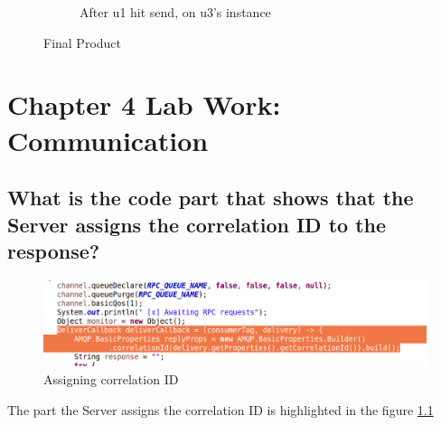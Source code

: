 \documentclass[11pt,a4paper]{report}
\begin{document}
\begin{figure}[h!]
\begin{subfigure}[b]{0.4\linewidth}
    		\caption{After u1 hit send, on u3's instance}
  		\end{subfigure}
  		\caption{Final Product}
  		\label{fig:chat}
	\end{figure}
	
	\chapter{Chapter 4 Lab Work: Communication}
	\newpage
	\section{What is the code part that shows that the Server assigns the correlation ID to the response?}
  	\begin{figure}[h!]
  		\includegraphics[width=\linewidth]{assign-corr-id.png}
  		\caption{Assigning correlation ID}
  		\label{fig:corr-id}
	\end{figure}
  	The part the Server assigns the correlation ID is highlighted in the figure \ref{fig:corr-id}
	
\end{document}
